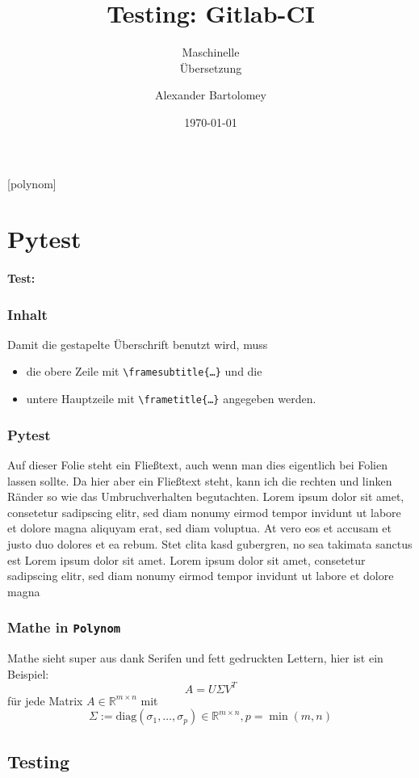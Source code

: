 \documentclass[t]{beamer}
\title{Testing: Gitlab-CI}
\subtitle{Maschinelle\\Übersetzung}
\date[Polynom]{\today}
\author{Alexander Bartolomey}
\institute[Polynom]{Polynom Aachen University}
\begin{document}
[polynom]{}

\begin{frame}[plain]
  \titlepage{}
\end{frame}

\section{Pytest}

\begin{frame}
  \framesubtitle{Test:}
  \frametitle{Inhalt}
  Damit die gestapelte Überschrift benutzt wird, muss \begin{itemize}
    \item die obere Zeile mit \texttt{\textbackslash{}framesubtitle\{\ldots \}} und die
    \item untere Hauptzeile mit \texttt{\textbackslash{}frametitle\{\ldots \}} angegeben werden.
  \end{itemize} 
\end{frame}

\begin{frame}
  \frametitle{Pytest}
  Auf dieser Folie steht ein Fließtext, auch wenn man dies eigentlich
  bei Folien lassen sollte.  Da hier aber ein Fließtext steht, kann
  ich die rechten und linken Ränder so wie das Umbruchverhalten begutachten. 
  Lorem ipsum dolor sit amet, consetetur sadipscing elitr, sed diam nonumy eirmod 
  tempor invidunt ut labore et dolore magna aliquyam erat, sed diam voluptua. 
  At vero eos et accusam et justo duo dolores et ea rebum. Stet clita kasd gubergren, 
  no sea takimata sanctus est Lorem ipsum dolor sit amet. Lorem ipsum dolor sit amet, 
  consetetur sadipscing elitr, sed diam nonumy eirmod tempor invidunt ut labore 
  et dolore magna
\end{frame}

\begin{frame}
  \frametitle{Mathe in \texttt{Polynom}}
  Mathe sieht super aus dank Serifen und fett gedruckten Lettern, hier ist ein Beispiel:
  \[A = U\Sigma V^T\]
  für jede Matrix \(A \in \mathbb{R}^{m\times n}\) mit \[\Sigma:=\mathrm{diag}(\sigma_1,\dots,\sigma_p) \in \mathbb{R}^{m\times n}, p = \min(m,n)\]
\end{frame}

\setPaletteRed
\subsection{Testing}
\end{document}
